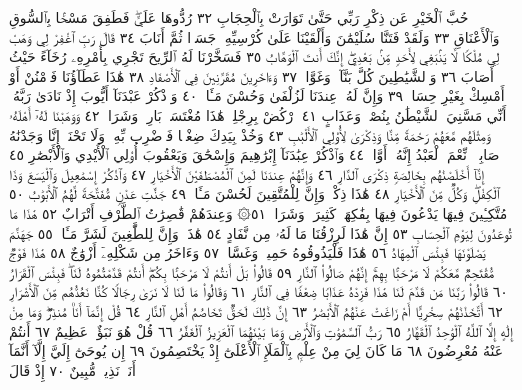 حُبَّ ٱلْخَيْرِ عَن ذِكْرِ رَبِّي حَتَّىٰ تَوَارَتْ بِٱلْحِجَابِ ٣٢ رُدُّوهَا عَلَيَّۖ
فَطَفِقَ مَسْحَۢا بِٱلسُّوقِ وَٱلْأَعْنَاقِ ٣٣ وَلَقَدْ فَتَنَّا سُلَيْمَٰنَ
وَأَلْقَيْنَا عَلَىٰ كُرْسِيِّهِۦ جَسَدࣰا ثُمَّ أَنَابَ ٣٤ قَالَ رَبِّ ٱغْفِرْ لِي وَهَبْ
لِي مُلْكࣰا لَّا يَنۢبَغِي لِأَحَدࣲ مِّنۢ بَعْدِيٓۖ إِنَّكَ أَنتَ ٱلْوَهَّابُ ٣٥
فَسَخَّرْنَا لَهُ ٱلرِّيحَ تَجْرِي بِأَمْرِهِۦ رُخَآءً حَيْثُ أَصَابَ ٣٦ وَٱلشَّيَٰطِينَ
كُلَّ بَنَّآءࣲ وَغَوَّاصࣲ ٣٧ وَءَاخَرِينَ مُقَرَّنِينَ فِي ٱلْأَصْفَادِ ٣٨ هَٰذَا
عَطَآؤُنَا فَٱمْنُنْ أَوْ أَمْسِكْ بِغَيْرِ حِسَابࣲ ٣٩ وَإِنَّ لَهُۥ عِندَنَا لَزُلْفَىٰ وَحُسْنَ
مَـَٔابࣲ ٤٠ وَٱذْكُرْ عَبْدَنَآ أَيُّوبَ إِذْ نَادَىٰ رَبَّهُۥٓ أَنِّي مَسَّنِيَ ٱلشَّيْطَٰنُ
بِنُصْبࣲ وَعَذَابٍ ٤١ ٱرْكُضْ بِرِجْلِكَۖ هَٰذَا مُغْتَسَلُۢ بَارِدࣱ وَشَرَابࣱ ٤٢
وَوَهَبْنَا لَهُۥٓ أَهْلَهُۥ وَمِثْلَهُم مَّعَهُمْ رَحْمَةࣰ مِّنَّا وَذِكْرَىٰ لِأُو۟لِي ٱلْأَلْبَٰبِ ٤٣
وَخُذْ بِيَدِكَ ضِغْثࣰا فَٱضْرِب بِّهِۦ وَلَا تَحْنَثْۗ إِنَّا وَجَدْنَٰهُ صَابِرࣰاۚ نِّعْمَ
ٱلْعَبْدُ إِنَّهُۥٓ أَوَّابࣱ ٤٤ وَٱذْكُرْ عِبَٰدَنَآ إِبْرَٰهِيمَ وَإِسْحَٰقَ وَيَعْقُوبَ أُو۟لِي
ٱلْأَيْدِي وَٱلْأَبْصَٰرِ ٤٥ إِنَّآ أَخْلَصْنَٰهُم بِخَالِصَةࣲ ذِكْرَى ٱلدَّارِ ٤٦
وَإِنَّهُمْ عِندَنَا لَمِنَ ٱلْمُصْطَفَيْنَ ٱلْأَخْيَارِ ٤٧ وَٱذْكُرْ إِسْمَٰعِيلَ
وَٱلْيَسَعَ وَذَا ٱلْكِفْلِۖ وَكُلࣱّ مِّنَ ٱلْأَخْيَارِ ٤٨ هَٰذَا ذِكْرࣱۚ وَإِنَّ لِلْمُتَّقِينَ
لَحُسْنَ مَـَٔابࣲ ٤٩ جَنَّٰتِ عَدْنࣲ مُّفَتَّحَةࣰ لَّهُمُ ٱلْأَبْوَٰبُ ٥٠ مُتَّكِـِٔينَ
فِيهَا يَدْعُونَ فِيهَا بِفَٰكِهَةࣲ كَثِيرَةࣲ وَشَرَابࣲ ٥١۞ وَعِندَهُمْ قَٰصِرَٰتُ
ٱلطَّرْفِ أَتْرَابٌ ٥٢ هَٰذَا مَا تُوعَدُونَ لِيَوْمِ ٱلْحِسَابِ ٥٣ إِنَّ هَٰذَا
لَرِزْقُنَا مَا لَهُۥ مِن نَّفَادٍ ٥٤ هَٰذَاۚ وَإِنَّ لِلطَّٰغِينَ لَشَرَّ مَـَٔابࣲ ٥٥
جَهَنَّمَ يَصْلَوْنَهَا فَبِئْسَ ٱلْمِهَادُ ٥٦ هَٰذَا فَلْيَذُوقُوهُ حَمِيمࣱ
وَغَسَّاقࣱ ٥٧ وَءَاخَرُ مِن شَكْلِهِۦٓ أَزْوَٰجٌ ٥٨ هَٰذَا فَوْجࣱ
مُّقْتَحِمࣱ مَّعَكُمْ لَا مَرْحَبَۢا بِهِمْۚ إِنَّهُمْ صَالُوا۟ ٱلنَّارِ ٥٩ قَالُوا۟
بَلْ أَنتُمْ لَا مَرْحَبَۢا بِكُمْۖ أَنتُمْ قَدَّمْتُمُوهُ لَنَاۖ فَبِئْسَ ٱلْقَرَارُ ٦٠
قَالُوا۟ رَبَّنَا مَن قَدَّمَ لَنَا هَٰذَا فَزِدْهُ عَذَابࣰا ضِعْفࣰا فِي ٱلنَّارِ ٦١
وَقَالُوا۟ مَا لَنَا لَا نَرَىٰ رِجَالࣰا كُنَّا نَعُدُّهُم مِّنَ ٱلْأَشْرَارِ ٦٢ أَتَّخَذْنَٰهُمْ
سِخْرِيًّا أَمْ زَاغَتْ عَنْهُمُ ٱلْأَبْصَٰرُ ٦٣ إِنَّ ذَٰلِكَ لَحَقࣱّ تَخَاصُمُ أَهْلِ
ٱلنَّارِ ٦٤ قُلْ إِنَّمَآ أَنَا۠ مُنذِرࣱۖ وَمَا مِنْ إِلَٰهٍ إِلَّا ٱللَّهُ ٱلْوَٰحِدُ ٱلْقَهَّارُ ٦٥
رَبُّ ٱلسَّمَٰوَٰتِ وَٱلْأَرْضِ وَمَا بَيْنَهُمَا ٱلْعَزِيزُ ٱلْغَفَّٰرُ ٦٦ قُلْ هُوَ نَبَؤٌا۟
عَظِيمٌ ٦٧ أَنتُمْ عَنْهُ مُعْرِضُونَ ٦٨ مَا كَانَ لِيَ مِنْ عِلْمِۭ بِٱلْمَلَإِ ٱلْأَعْلَىٰٓ
إِذْ يَخْتَصِمُونَ ٦٩ إِن يُوحَىٰٓ إِلَيَّ إِلَّآ أَنَّمَآ أَنَا۠ نَذِيرࣱ مُّبِينٌ ٧٠ إِذْ قَالَ
